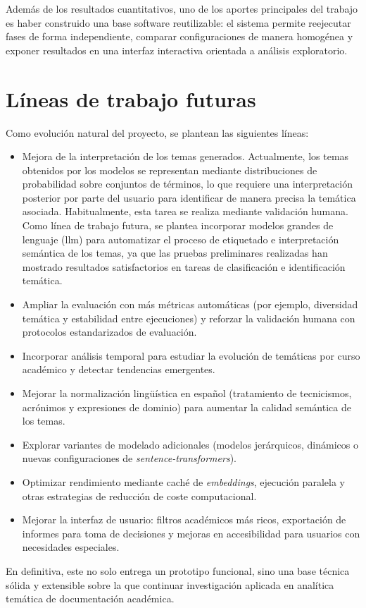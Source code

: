Además de los resultados cuantitativos, uno de los aportes principales del
trabajo es haber construido una base software reutilizable: el sistema permite
reejecutar fases de forma independiente, comparar configuraciones de manera
homogénea y exponer resultados en una interfaz interactiva orientada a análisis
exploratorio.

\section{Líneas de trabajo futuras}

Como evolución natural del proyecto, se plantean las siguientes líneas:

\begin{itemize}
      \item Mejora de la interpretación de los temas generados. Actualmente, los temas
            obtenidos por los modelos se representan mediante distribuciones de
            probabilidad sobre conjuntos de términos, lo que requiere una interpretación
            posterior por parte del usuario para identificar de manera precisa la temática
            asociada. Habitualmente, esta tarea se realiza mediante validación humana. Como
            línea de trabajo futura, se plantea incorporar modelos grandes de lenguaje
            (\acrfull{llm}) para automatizar el proceso de etiquetado e interpretación
            semántica de los temas, ya que las pruebas preliminares realizadas han mostrado
            resultados satisfactorios en tareas de clasificación e identificación temática.
      \item Ampliar la evaluación con más métricas automáticas (por ejemplo, diversidad
            temática y estabilidad entre ejecuciones) y reforzar la validación humana con
            protocolos estandarizados de evaluación.
      \item Incorporar análisis temporal para estudiar la evolución de temáticas por curso
            académico y detectar tendencias emergentes.
      \item Mejorar la normalización lingüística en español (tratamiento de tecnicismos,
            acrónimos y expresiones de dominio) para aumentar la calidad semántica de los
            temas.
      \item Explorar variantes de modelado adicionales (modelos jerárquicos, dinámicos o
            nuevas configuraciones de \textit{sentence-transformers}).
      \item Optimizar rendimiento mediante caché de \textit{embeddings}, ejecución paralela
            y otras estrategias de reducción de coste computacional.
      \item Mejorar la interfaz de usuario: filtros académicos más ricos, exportación de
            informes para toma de decisiones y mejoras en accesibilidad para usuarios con
            necesidades especiales.
\end{itemize}

En definitiva, este  no solo entrega un prototipo funcional, sino
una base técnica sólida y extensible sobre la que continuar investigación
aplicada en analítica temática de documentación académica.
